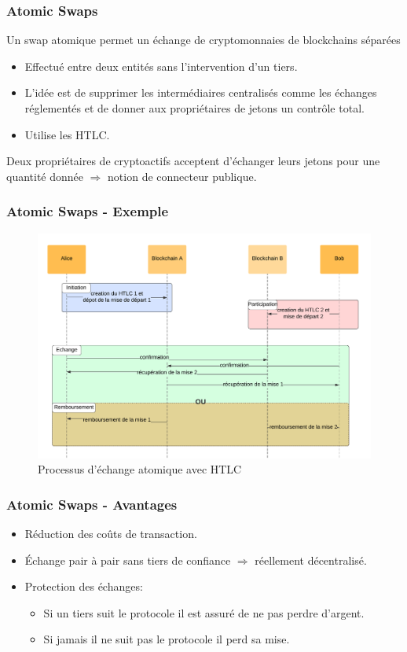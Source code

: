 \begin{frame}
	\frametitle{Atomic Swaps}
	Un swap atomique permet un échange de cryptomonnaies de blockchains séparées
	\begin{itemize}
		\item Effectué entre deux entités sans l’intervention d’un tiers.
		\item L’idée est de supprimer les intermédiaires centralisés comme les échanges réglementés et de donner aux propriétaires de jetons un contrôle total.
		\item Utilise les HTLC. \newline
	\end{itemize}
	Deux propriétaires de cryptoactifs acceptent d’échanger leurs jetons pour une quantité donnée
	$\Rightarrow$ notion de connecteur publique.
\end{frame}

\begin{frame}
	\frametitle{Atomic Swaps - Exemple}
	\begin{figure}
		\includegraphics[scale = 0.10]{decentralisation/atomicSwap.png}
		\caption{Processus d'échange atomique avec HTLC}
	\end{figure}

\end{frame}

\begin{frame}
	\frametitle{Atomic Swaps - Avantages}
	\subtitle{Avantages}
	\begin{itemize}
		\item Réduction des coûts de transaction.
		\item Échange pair à pair sans tiers de confiance $\Rightarrow$ réellement décentralisé.
		\item Protection des échanges:
		      \begin{itemize}
			      \item Si un tiers suit le protocole il est assuré de ne pas perdre d'argent.
			      \item Si jamais il ne suit pas le protocole il perd sa mise.
		      \end{itemize}
	\end{itemize}
\end{frame}

